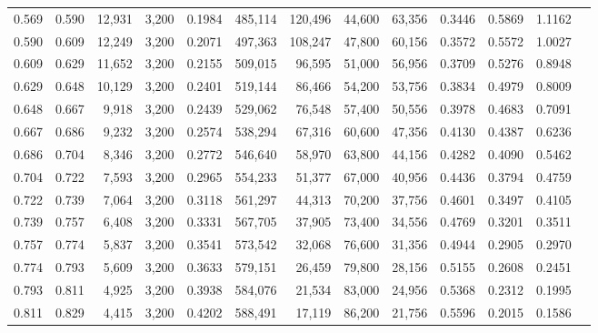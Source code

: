 \begin{tabular}{rrrrrrrrrrrrr}
0.569 & 0.590 &  12,931 & 3,200 &                                     0.1984 & 485,114 & 120,496 &  44,600 &  63,356 & 0.3446 & 0.5869 & 1.1162 \\
0.590 & 0.609 &  12,249 & 3,200 &                                     0.2071 & 497,363 & 108,247 &  47,800 &  60,156 & 0.3572 & 0.5572 & 1.0027 \\
0.609 & 0.629 &  11,652 & 3,200 &                                     0.2155 & 509,015 &  96,595 &  51,000 &  56,956 & 0.3709 & 0.5276 & 0.8948 \\
0.629 & 0.648 &  10,129 & 3,200 &                                     0.2401 & 519,144 &  86,466 &  54,200 &  53,756 & 0.3834 & 0.4979 & 0.8009 \\
0.648 & 0.667 &   9,918 & 3,200 &                                     0.2439 & 529,062 &  76,548 &  57,400 &  50,556 & 0.3978 & 0.4683 & 0.7091 \\
0.667 & 0.686 &   9,232 & 3,200 &                                     0.2574 & 538,294 &  67,316 &  60,600 &  47,356 & 0.4130 & 0.4387 & 0.6236 \\
0.686 & 0.704 &   8,346 & 3,200 &                                     0.2772 & 546,640 &  58,970 &  63,800 &  44,156 & 0.4282 & 0.4090 & 0.5462 \\
0.704 & 0.722 &   7,593 & 3,200 &                                     0.2965 & 554,233 &  51,377 &  67,000 &  40,956 & 0.4436 & 0.3794 & 0.4759 \\
0.722 & 0.739 &   7,064 & 3,200 &                                     0.3118 & 561,297 &  44,313 &  70,200 &  37,756 & 0.4601 & 0.3497 & 0.4105 \\
0.739 & 0.757 &   6,408 & 3,200 &                                     0.3331 & 567,705 &  37,905 &  73,400 &  34,556 & 0.4769 & 0.3201 & 0.3511 \\
0.757 & 0.774 &   5,837 & 3,200 &                                     0.3541 & 573,542 &  32,068 &  76,600 &  31,356 & 0.4944 & 0.2905 & 0.2970 \\
0.774 & 0.793 &   5,609 & 3,200 &                                     0.3633 & 579,151 &  26,459 &  79,800 &  28,156 & 0.5155 & 0.2608 & 0.2451 \\
0.793 & 0.811 &   4,925 & 3,200 &                                     0.3938 & 584,076 &  21,534 &  83,000 &  24,956 & 0.5368 & 0.2312 & 0.1995 \\
0.811 & 0.829 &   4,415 & 3,200 &                                     0.4202 & 588,491 &  17,119 &  86,200 &  21,756 & 0.5596 & 0.2015 & 0.1586 \\

\end{tabular}
